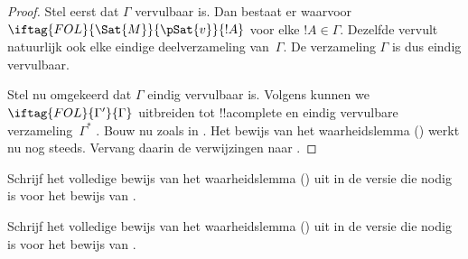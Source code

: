 \documentclass[../../../include/open-logic-section]{subfiles}
\begin{document}
\begin{proof}
Stel eerst dat $\Gamma$ vervulbaar is. Dan bestaat er
waarvoor $\iftag{FOL}{\Sat{M}}{\pSat{v}}{!A}$ voor elke $!A \in \Gamma$.
Dezelfde  vervult natuurlijk ook
elke eindige deelverzameling van~$\Gamma$. De verzameling $\Gamma$ is dus
eindig vervulbaar.

Stel nu omgekeerd dat $\Gamma$ eindig vervulbaar is. Volgens
 kunnen we $\iftag{FOL}{\Gamma'}{\Gamma}$
uitbreiden tot !!a{complete} en eindig vervulbare verzameling~$\Gamma^*$
.
Bouw nu 
zoals in . Het bewijs van het waarheidslemma
() werkt nu nog steeds. Vervang daarin de
verwijzingen naar .
\end{proof}

\begin{prob}
Schrijf het volledige bewijs van het waarheidslemma
() uit in de versie die nodig is voor
het bewijs van .
\end{prob}
\tagendprob

\begin{prob}
Schrijf het volledige bewijs van het waarheidslemma
() uit in de versie die nodig is voor
het bewijs van .
\end{prob}
\tagendprob
\end{document}
